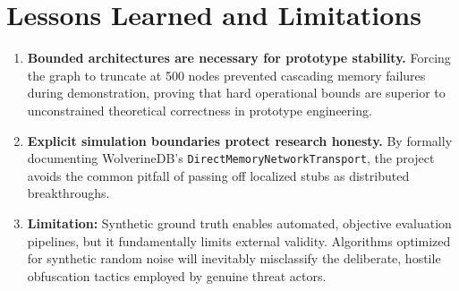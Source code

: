 \section{Lessons Learned and Limitations}
\label{sec:disc-lessons}
\begin{enumerate}
    \item \textbf{Bounded architectures are necessary for prototype stability.} Forcing the graph to truncate at 500 nodes prevented cascading memory failures during demonstration, proving that hard operational bounds are superior to unconstrained theoretical correctness in prototype engineering.
    \item \textbf{Explicit simulation boundaries protect research honesty.} By formally documenting WolverineDB's \texttt{DirectMemoryNetworkTransport}, the project avoids the common pitfall of passing off localized stubs as distributed breakthroughs.
    \item \textbf{Limitation:} Synthetic ground truth enables automated, objective evaluation pipelines, but it fundamentally limits external validity. Algorithms optimized for synthetic random noise will inevitably misclassify the deliberate, hostile obfuscation tactics employed by genuine threat actors.
\end{enumerate}
